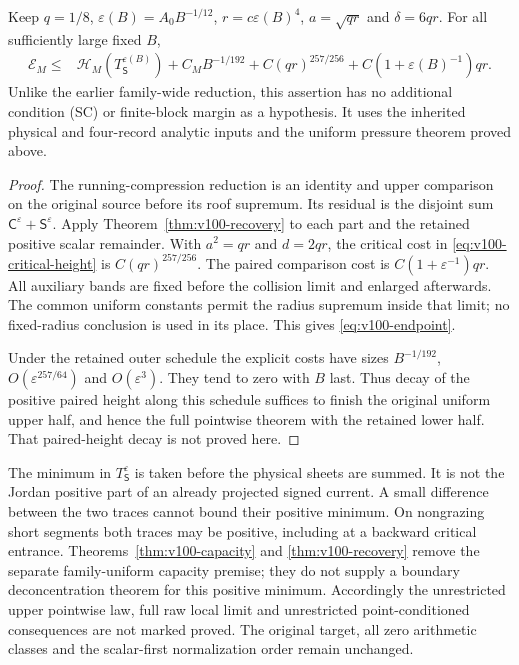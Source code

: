 \begin{theorem}
\label{thm:v100-endpoint}
Keep $q=1/8$, $\varepsilon(B)=A_0B^{-1/12}$,
$r=c\varepsilon(B)^4$, $a=\sqrt{qr}$ and $\delta=6qr$.
For all sufficiently large fixed $B$,
\begin{align}
 \mathcal E_M\le{}&\mathcal H_M(T_{\mathsf S}^{\varepsilon(B)})
       +C_MB^{-1/192}
       +C(qr)^{257/256}
       +C(1+\varepsilon(B)^{-1})qr.
                                               \label{eq:v100-endpoint}
\end{align}
Unlike the earlier family-wide reduction, this assertion has no
additional condition (SC) or finite-block margin as a hypothesis.
It uses the inherited physical and four-record analytic inputs and
the uniform pressure theorem proved above.
\end{theorem}
\begin{proof}
The running-compression reduction is an identity and upper comparison
on the original source before its roof supremum. Its residual is the
disjoint sum $\mathsf C^\varepsilon+\mathsf S^\varepsilon$.
Apply Theorem~\ref{thm:v100-recovery} to each part and the retained
positive scalar remainder. With $a^2=qr$ and $d=2qr$, the critical
cost in \eqref{eq:v100-critical-height} is $C(qr)^{257/256}$.
The paired comparison cost is $C(1+\varepsilon^{-1})qr$.
All auxiliary bands are fixed before the collision limit and enlarged
afterwards. The common uniform constants permit the radius supremum
inside that limit; no fixed-radius conclusion is used in its place.
This gives \eqref{eq:v100-endpoint}.

Under the retained outer schedule the explicit costs have sizes
$B^{-1/192}$, $O(\varepsilon^{257/64})$ and $O(\varepsilon^3)$.
They tend to zero with $B$ last. Thus decay of the positive paired
height along this schedule suffices to finish the original uniform
upper half, and hence the full pointwise theorem with the retained
lower half. That paired-height decay is not proved here.
\end{proof}

\begin{remark}\label{rem:v100-positive}
The minimum in $T_{\mathsf S}^\varepsilon$ is taken before the
physical sheets are summed. It is not the Jordan positive part of
an already projected signed current. A small difference between the
two traces cannot bound their positive minimum. On nongrazing short
segments both traces may be positive, including at a backward
critical entrance. Theorems~\ref{thm:v100-capacity} and
\ref{thm:v100-recovery} remove the separate family-uniform capacity
premise; they do not supply a boundary deconcentration theorem for
this positive minimum. Accordingly the unrestricted upper pointwise
law, full raw local limit and unrestricted point-conditioned
consequences are not marked proved. The original target, all zero
arithmetic classes and the scalar-first normalization order remain
unchanged.
\end{remark}
